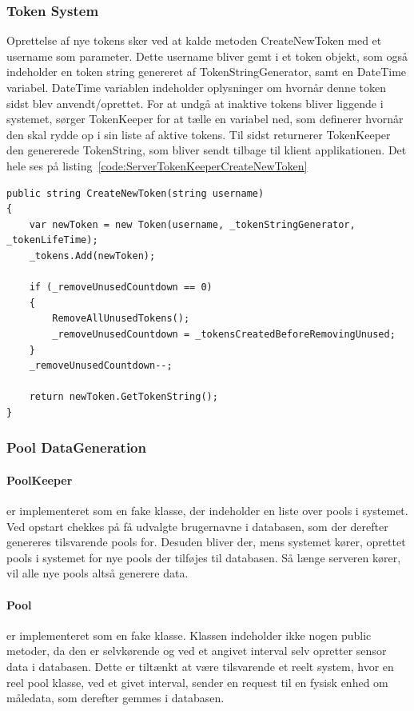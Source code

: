 \subsubsection{Token System}
Oprettelse af nye tokens sker ved at kalde metoden CreateNewToken med et username som parameter. Dette username bliver gemt i et token objekt, som også indeholder en token string genereret af TokenStringGenerator, samt en DateTime variabel. DateTime variablen indeholder oplysninger om hvornår denne token sidst blev anvendt/oprettet.
For at undgå at inaktive tokens bliver liggende i systemet, sørger TokenKeeper for at tælle en variabel ned, som definerer hvornår den skal rydde op i sin liste af aktive tokens. Til sidst returnerer TokenKeeper den genererede TokenString, som bliver sendt tilbage til klient applikationen. Det hele ses på listing~\ref{code:ServerTokenKeeperCreateNewToken}
\begin{lstlisting}[caption=Server.TokenKeeper.CreateNewToken,label=code:ServerTokenKeeperCreateNewToken]
public string CreateNewToken(string username)
{
	var newToken = new Token(username, _tokenStringGenerator, _tokenLifeTime);
	_tokens.Add(newToken);
	
	if (_removeUnusedCountdown == 0)
	{
		RemoveAllUnusedTokens();
		_removeUnusedCountdown = _tokensCreatedBeforeRemovingUnused;
	}
	_removeUnusedCountdown--;
	
	return newToken.GetTokenString();
}
\end{lstlisting}

\subsubsection{Pool DataGeneration}
\paragraph{PoolKeeper} er implementeret som en fake klasse, der indeholder en liste over pools i systemet. Ved opstart chekkes på få udvalgte brugernavne i databasen, som der derefter genereres tilsvarende pools for. Desuden bliver der, mens systemet kører, oprettet pools i systemet for nye pools der tilføjes til databasen. Så længe serveren kører, vil alle nye pools altså generere data.

\paragraph{Pool} er implementeret som en fake klasse. Klassen indeholder ikke nogen public metoder, da den er selvkørende og ved et angivet interval selv opretter sensor data i databasen. Dette er tiltænkt at være tilsvarende et reelt system, hvor en reel pool klasse, ved et givet interval, sender en request til en fysisk enhed om måledata, som derefter gemmes i databasen.

